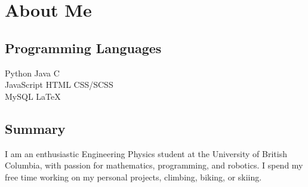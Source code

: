 \documentclass[]{deedy-resume-openfont}
\begin{document}
\section{About Me}
\begin{minipage}[t]{.35\textwidth}
	\subsection{Programming Languages}
	Python \textbullet{} Java \textbullet{} C \\
	JavaScript \textbullet{} HTML \textbullet{} CSS/SCSS \\
	MySQL \textbullet{} \LaTeX
	\sectionsep
\end{minipage}
\hfill
\begin{minipage}[t]{.55\textwidth}
	\subsection{Summary}
	I am an enthusiastic Engineering Physics student at the University of British Columbia, with passion for mathematics, programming, and robotics. I spend my free time working on my personal projects, climbing, biking, or skiing.
	\vspace{5pt}
\end{minipage}
\end{document}
